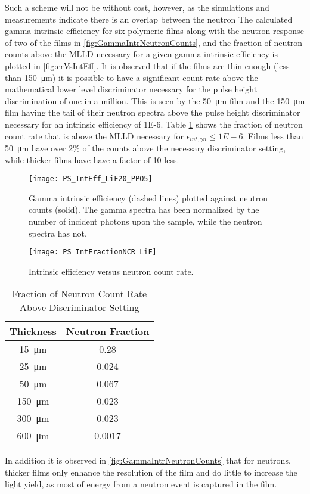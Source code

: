 Such a scheme will not be without cost, however, as the simulations and measurements indicate there is an overlap between the neutron 
The calculated gamma intrinsic efficiency for six polymeric films along with the neutron response of two of the films in \autoref{fig:GammaIntrNeutronCounts}, and the fraction of neutron counts above the MLLD necessary for a given gamma intrinsic efficiency is plotted in \autoref{fig:crVsIntEff}.
It is observed that if the films are thin enough (less than \SI{150}{\um}) it is possible to have a significant count rate above the mathematical lower level discriminator necessary for the pulse height discrimination of one in a million.
This is seen by the \SI{50}{\um} film and the \SI{150}{\um} film having the tail of their neutron spectra above the pulse height discriminator necessary for an intrinsic efficiency of \num{1E-6}.
Table \ref{tab:FractionCRGamma} shows the fraction of neutron count rate that is above the MLLD necessary for $\epsilon_{int,\gamma n} \le \si{1E-6}$.
Films less than \SI{50}{\um} have over 2\% of the counts above the necessary discriminator setting, while thicker films have have a factor of 10 less.
\begin{figure}[ht]
    \centering
    \texttt{[image: PS\_IntEff\_LiF20\_PPO5]}
    \caption[PS Gamma intrinsic efficiency and neutron count rate]{Gamma intrinsic efficiency (dashed lines) plotted against neutron counts (solid). The gamma spectra has been normalized by the number of incident photons upon the sample, while the neutron spectra has not.}
    \label{fig:GammaIntrNeutronCounts}
\end{figure}
\begin{figure}[ht]
    \centering
    \texttt{[image: PS\_IntFractionNCR\_LiF]}
    \caption{Intrinsic efficiency versus neutron count rate. }
    \label{fig:crVsIntEff}
\end{figure}
\begin{table}[]
    \caption{Fraction of Neutron Count Rate Above Discriminator Setting}
	\centering
	\begin{tabular}{c | c}
	Thickness & Neutron Fraction \\
	\hline
	\hline
	\SI{15}{\um} & 0.28 \\
	\SI{25}{\um} & 0.024 \\
	\SI{50}{\um}  & 0.067 \\
	\SI{150}{\um}  & 0.023 \\
	\SI{300}{\um}  & 0.023 \\
	\SI{600}{\um}  & 0.0017 \\
	\end{tabular}
  \label{tab:FractionCRGamma}
\end{table}
In addition it is observed in \autoref{fig:GammaIntrNeutronCounts} that for neutrons, thicker films only enhance the resolution of the film and do little to increase the light yield, as most of energy from a neutron event is captured in the film.
